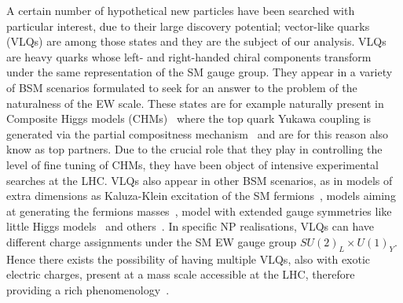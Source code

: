 \documentclass[a4paper]{article}
\begin{document}
A certain number of hypothetical new particles have been searched with particular interest, due to their large discovery potential; vector-like quarks (VLQs) are among those states and they are the subject of our analysis.
VLQs are heavy quarks whose left- and right-handed chiral components transform under the same representation of the SM gauge group. They appear in a variety of BSM scenarios formulated to seek for an answer to the problem of the naturalness of the EW scale. 
These states are for example naturally present in Composite Higgs models (CHMs)~\cite{Kaplan:1983fs} where the top quark Yukawa coupling is generated via the partial compositness mechanism~\cite{Kaplan:1991dc} and are for this reason also know as top partners. Due to the crucial role that they play in controlling the level of fine tuning of CHMs, they have been object of intensive experimental searches at the LHC. 
VLQs also appear in other BSM scenarios, as in models of extra dimensions as Kaluza-Klein excitation of the SM fermions~\cite{Antoniadis:1990ew,Csaki:2003sh,Cacciapaglia:2009pa}, models aiming at generating the fermions masses~\cite{Grossman:1999ra}, model with extended gauge symmetries like little Higgs models~\cite{ArkaniHamed:2002qx} and others~\cite{Abbas:2017hzw,Abbas:2017vle}.
In specific NP realisations, VLQs can have different charge assignments under the SM EW gauge group $SU(2)_L \times U(1)_Y$. Hence there exists the possibility of having multiple VLQs, also with exotic electric charges, present at a mass scale accessible at the LHC, therefore providing a rich phenomenology~\cite{AguilarSaavedra:2009es,DeSimone:2012fs,Aguilar-Saavedra:2013qpa,Barducci:2013zaa,Alok:2014yua,Barducci:2014ila,Cacciapaglia:2015ixa,Alok:2015iha}.
\end{document}
